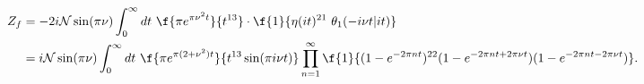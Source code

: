 \begin{equation}
\begin{split}
Z_{f}&=-2i{\cal N}\sin(\pi\nu)\int_{0}^{\infty} dt\
\f{\pi e^{\pi\nu^2 t}}{t^{13}}
\cdot
\f{1}{\eta(it)^{21}\ \theta_1(-i\nu t|it)}
\\
&=i{\cal N}\sin(\pi\nu)\int_{0}^{\infty} dt\
\f{\pi e^{\pi(2+\nu^2) t}}{t^{13}\sin(\pi i\nu t)}
\prod_{n=1}^\infty
\f{1}{(1-e^{-2\pi nt})^{22}(1-e^{-2\pi nt+2\pi\nu t})
(1-e^{-2\pi nt-2\pi\nu t})}. \label{oampf}
\end{split}
\end{equation}

